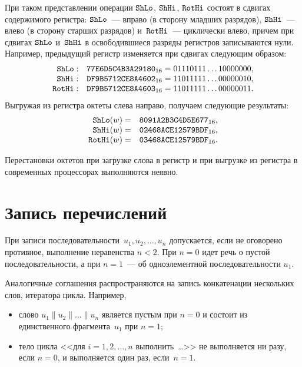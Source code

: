 При таком представлении операции $\mathop{\texttt{ShLo}}\nolimits$, $\mathop{\texttt{ShHi}}\nolimits$, $\mathop{\texttt{RotHi}}\nolimits$ состоят в
сдвигах содержимого регистра: 
$\mathop{\texttt{ShLo}}\nolimits$~--- вправо (в сторону младших разрядов),
$\mathop{\texttt{ShHi}}\nolimits$~--- влево (в сторону старших разрядов)
и~$\mathop{\texttt{RotHi}}\nolimits$~--- циклически влево,
причем при сдвигах $\mathop{\texttt{ShLo}}\nolimits$ и~$\mathop{\texttt{ShHi}}\nolimits$ в освободившиеся разряды 
регистров записываются нули.
%
Например, предыдущий регистр изменяется при сдвигах следующим образом:
$$      
\begin{array}{rl}
\mathop{\texttt{ShLo}}\nolimits: &\texttt{77E6D5C4B3A29180}_{16}
=0 1110111\ldots 1 0000000
,\\
\mathop{\texttt{ShHi}}\nolimits: &\texttt{DF9B5712CE8A4602}_{16}
=1101111 1 \ldots 0000001 0
,\\
\mathop{\texttt{RotHi}}\nolimits: &\texttt{DF9B5712CE8A4603}_{16}
=1101111 1\ldots 0000001 1
.
\end{array}
$$
Выгружая из регистра октеты слева направо, 
получаем следующие результаты:
$$
\begin{array}{rl}
\mathop{\texttt{ShLo}}\nolimits(w)=  &\texttt{8091A2B3C4D5E677}_{16},\\
\mathop{\texttt{ShHi}}\nolimits(w)=  &\texttt{02468ACE12579BDF}_{16},\\
\mathop{\texttt{RotHi}}\nolimits(w)= &\texttt{03468ACE12579BDF}_{16}.
\end{array}
$$

Перестановки октетов при загрузке слова в регистр и при выгрузке из 
регистра в современных процессорах выполняются неявно.

\section{Запись перечислений}\label{DEFS.Seqs}

При записи последовательности~$u_1,u_2,\ldots,u_n$ 
допускается, если не оговорено противное, выполнение неравенства $n<2$.
При $n=0$ идет речь о пустой последовательности, 
а при $n=1$~--- об одноэлементной последовательности $u_1$.

Аналогичные соглашения распространяются на запись конкатенации нескольких 
слов, итератора цикла.
%
Например,
\begin{itemize}
\item
слово $u_1\parallel u_2\parallel\ldots\parallel u_n$ является пустым при $n=0$ 
и состоит из единственного фрагмента~$u_1$ при $n=1$;
\item
тело цикла <<для $i=1,2,\ldots,n$ выполнить~\ldots>>
не выполняется ни разу, если $n=0$, и выполняется один раз, если~$n=1$.
\end{itemize}
